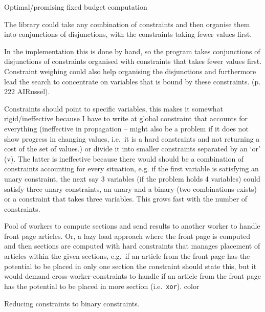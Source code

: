 Optimal/promising
fixed budget computation

The library could take any combination of constraints and then organise them into conjunctions of disjunctions, with the constraints taking fewer values first.

In the implementation this is done by hand, so the program takes conjunctions of disjunctions of constraints organised with constraints that takes fewer values first. Constraint weighing could also help organising the disjunctions and furthermore lead the search to concentrate on variables that is bound by these constraints. (p. 222 AIRussel).

Constraints should point to specific variables, this makes it somewhat rigid/ineffective because I have to write at global constraint that accounts for everything (ineffective in propagation -- might also be a problem if it does not show progress in changing values, i.e.\ it is a hard constraints and not returning a cost of the set of values.) or divide it into smaller constraints separated by an `or' (v). The latter is ineffective because there would should be a combination of constraints accounting for every situation, e.g. if the first variable is satisfying an unary constraint, the next say 3 variables (if the problem holds 4 variables) could satisfy three unary constraints, an unary and a binary (two combinations exists) or a constraint that takes three variables. This grows fast with the number of constraints.


Pool of workers to compute sections and send results to another worker to handle front page articles. Or, a lazy load approach where the front page is computed and then sections are computed with hard constraints that manages placement of articles within the given sections, e.g.\ if an article from the front page has the potential to be placed in only one section the constraint should state this, but it would demand cross-worker-constraints to handle if an article from the front page has the potential to be placed in more section (i.e.\ \texttt{xor}). color

Reducing constraints to binary constraints.

